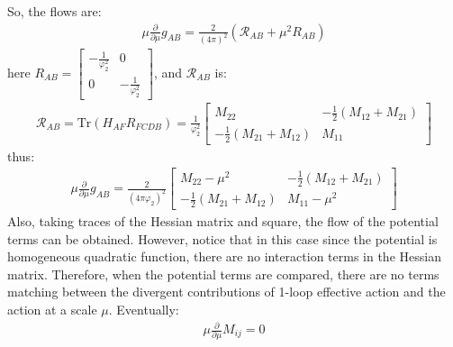 \documentclass[fleqn]{article}
\begin{document}
So, the flows  are:
\begin{align}
\mu \frac{\partial}{\partial \mu} g_{AB} = \frac{2}{(4\pi)^{2}} (\mathcal{R}_{AB} + \mu^{2}R_{AB}) 
\end{align}
here $R_{AB} = \begin{bmatrix}
-\frac{1}{\varphi _{2} ^{2}} & 0 \\
0 & -\frac{1}{\varphi _{2} ^{2}}
\end{bmatrix}$, and $\mathcal{R}_{AB}$ is:
\begin{align}
\mathcal{R} _{AB} = \text{Tr}(H_{AF} R_{FCDB}) = \frac{1}{\varphi_{2}^{2}}\begin{bmatrix}
M_{22} & -\frac{1}{2}(M_{12}+M_{21}) \\
-\frac{1}{2}(M_{21}+ M_{12} ) & M_{11}
\end{bmatrix}
\end{align} 
thus:
\begin{align}
\mu \frac{\partial}{\partial \mu} g_{AB} = \frac{2}{(4\pi \varphi_{2})^{2}}\begin{bmatrix}
M_{22} -\mu ^{2} & -\frac{1}{2}(M_{12}+M_{21}) \\
-\frac{1}{2}(M_{21}+M_{12}) & M_{11} -\mu^{2}
\end{bmatrix}
\end{align}
Also, taking traces of the Hessian matrix and square, the flow of the potential terms can be obtained. However, notice that in this case since the potential is homogeneous quadratic function, there are no interaction terms in the Hessian matrix. Therefore, when the potential terms are compared, there are no terms matching between the divergent contributions of 1-loop effective action and the action at a scale $\mu$. Eventually:
\begin{align}
\mu \frac{\partial}{\partial \mu} M_{ij} = 0
\end{align}
\end{document}
